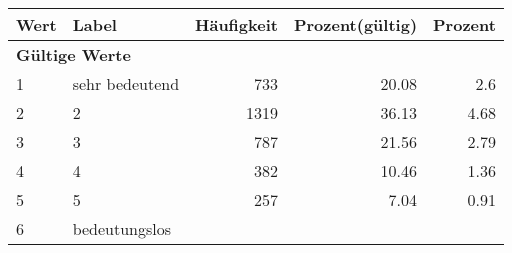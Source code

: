      \begin{longtable}{lXrrr}
     \toprule
     \textbf{Wert} & \textbf{Label} & \textbf{Häufigkeit} & \textbf{Prozent(gültig)} & \textbf{Prozent} \\
     \endhead
     \midrule
     \multicolumn{5}{l}{\textbf{Gültige Werte}}\\

     1 &
     \multicolumn{1}{X}{ sehr bedeutend   } &


       \num{733} &
       \num[round-mode=places,round-precision=2]{20.08} &
         \num[round-mode=places,round-precision=2]{2.6} \\

     2 &
     \multicolumn{1}{X}{ 2   } &


       \num{1319} &
       \num[round-mode=places,round-precision=2]{36.13} &
         \num[round-mode=places,round-precision=2]{4.68} \\

     3 &
     \multicolumn{1}{X}{ 3   } &


       \num{787} &
       \num[round-mode=places,round-precision=2]{21.56} &
         \num[round-mode=places,round-precision=2]{2.79} \\

     4 &
     \multicolumn{1}{X}{ 4   } &


       \num{382} &
       \num[round-mode=places,round-precision=2]{10.46} &
         \num[round-mode=places,round-precision=2]{1.36} \\

     5 &
     \multicolumn{1}{X}{ 5   } &


       \num{257} &
       \num[round-mode=places,round-precision=2]{7.04} &
         \num[round-mode=places,round-precision=2]{0.91} \\

     6 &
     \multicolumn{1}{X}{ bedeutungslos   } &



\end{longtable}
